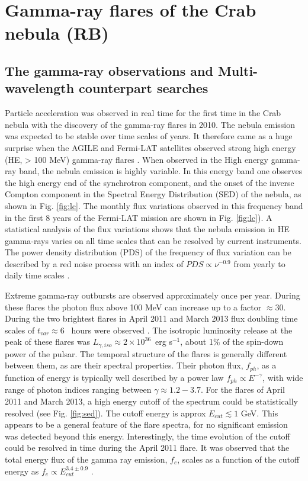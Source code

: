 \section{Gamma-ray flares of the Crab nebula (RB)}
\label{sec:flares}

\subsection{The gamma-ray observations and Multi-wavelength counterpart searches}

Particle acceleration was observed in real time for the first time in the Crab nebula with the discovery of the gamma-ray flares in 2010.  The nebula emission was expected to  be stable over time scales of years. It therefore came as a huge surprise when the AGILE and Fermi-LAT satellites observed strong high energy (HE, > 100 MeV) gamma-ray flares \citep{Tavani2011,Abdo2011}. When observed in the High energy  gamma-ray band, the nebula emission is highly variable. In this energy band one observes the high energy end of the synchrotron component, and the onset of the inverse Compton component in the Spectral Energy Distribution (SED) of the nebula, as shown in Fig. \ref{fig:lc}. The monthly flux variations observed in this frequency band in the first 8 years of the Fermi-LAT mission are shown in Fig. \ref{fig:lc}). A statistical analysis of the flux variations shows that the nebula emission in HE gamma-rays varies on all time scales that can be resolved by current instruments. The power density distribution (PDS) of the frequency of flux variation can be described by a red noise process with an index of $PDS \propto \nu^{-0.9}$  from yearly to daily time scales \citep{buehler2012}.

Extreme gamma-ray outbursts are observed approximately once per year. During these flares the photon flux above 100 MeV can increase up to a factor $\approx 30$. During the two brightest flares in April 2011 and March 2013 flux doubling time scales of $t_{var}\approx 6$~ hours were observed \citep{buehler2012,Mayer2013}. The isotropic luminosity release at the peak of these flares was $L_{\gamma, iso} \approx 2 \times 10^{36}$~erg s$^{-1}$, about 1\% of the spin-down power of the pulsar. The temporal structure of the flares is generally different between them, as are their spectral properties. Their photon flux, $f_{ph}$,  as a function of energy is typically well described by a power law $f_{ph} \propto E^{-\gamma}$, with  wide range of photon indices ranging between  $\gamma \approx 1.2 - 3.7$. For the flares of April 2011 and March 2013, a high energy cutoff of the spectrum could be statistically resolved (see Fig. \ref{fig:sed}). The cutoff energy is approx $E_{cut} \lesssim 1$ GeV. This appears to be a general feature of the flare spectra, for no significant emission was detected beyond this energy. Interestingly, the time evolution of the cutoff could be resolved in time during the April 2011 flare. It was observed that the total energy flux of the gamma ray emission, $f_e$,  scales as a function of the cutoff energy as $f_e \propto E_{cut}^{3.4 \pm 0.9}$  \citep{buehler2012}.

